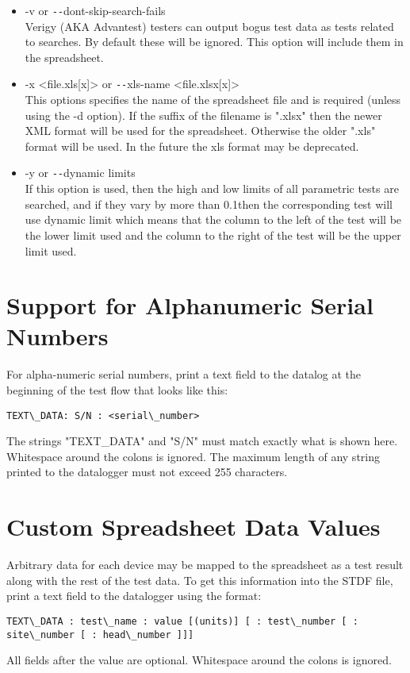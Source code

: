 \documentclass[letterpaper]{article}
\begin{document}
\begin{itemize}
\item -v or \texttt{-{}-}dont-skip-search-fails\\
Verigy (AKA Advantest) testers can output bogus test data as tests related to searches.  By default
these will be ignored.  This option will include them in the spreadsheet.
\item -x <file.xls[x]> or \texttt{-{}-}xls-name <file.xlsx[x]>\\
This options specifies the name of the spreadsheet file and is required (unless using the -d option).
If the suffix of the filename is ".xlsx" then the newer XML format will be used for the spreadsheet.
Otherwise the older ".xls" format will be used.  In the future the xls format may be deprecated.
\item -y or \texttt{-{}-}dynamic limits\\
If this option is used, then the high and low limits of all parametric tests are
searched, and if they vary by more than 0.1\percent then the corresponding test will use dynamic limit
which means that the column to the left of the test will be the lower limit used and the column to
the right of the test will be the upper limit used.
\end{itemize}
\clearpage
\section{Support for Alphanumeric Serial Numbers}
For alpha-numeric serial numbers, print a text field to the datalog
at the beginning of the test flow that looks like this:

\begin{verbatim}
TEXT\_DATA: S/N : <serial\_number>
\end{verbatim}
The strings "TEXT\_DATA" and "S/N" must match exactly what is shown here.  Whitespace
around the colons is ignored.  The maximum length of any string printed to the datalogger
must not exceed 255 characters.

\section{Custom Spreadsheet Data Values}
Arbitrary data for each device may be mapped to the spreadsheet as a test result along
with the rest of the test data.  To get this information into the STDF file, print a 
text field to the datalogger using the format:
\begin{verbatim}
TEXT\_DATA : test\_name : value [(units)] [ : test\_number [ : site\_number [ : head\_number ]]]
\end{verbatim}
All fields after the value are optional.  Whitespace around the colons is ignored.
\end{document}

